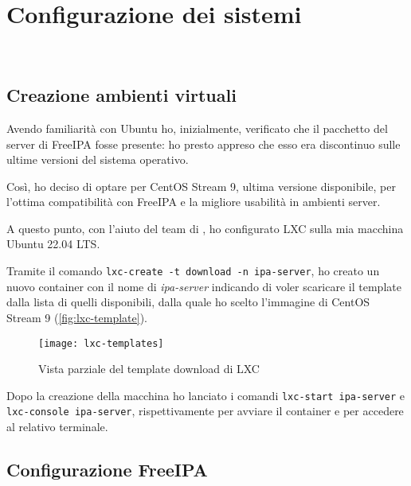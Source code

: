 
\chapter{Configurazione dei sistemi}
\label{cap:configurazione-sistemi}

\\

\section{Creazione ambienti virtuali}

Avendo familiarità con Ubuntu ho, inizialmente, verificato che il pacchetto del server di FreeIPA fosse presente: ho presto appreso che esso era discontinuo sulle ultime versioni del sistema operativo.

Così, ho deciso di optare per CentOS Stream 9, ultima versione disponibile, per l'ottima compatibilità con FreeIPA e la migliore usabilità in ambienti server.

A questo punto, con l'aiuto del team di \myAzienda, ho configurato LXC sulla mia macchina Ubuntu 22.04 LTS. 

Tramite il comando \texttt{lxc-create -t download -n ipa-server}, ho creato un nuovo container con il nome di \emph{ipa-server} indicando di voler scaricare il template dalla lista di quelli disponibili, dalla quale ho scelto l'immagine di CentOS Stream 9 (\autoref{fig:lxc-template}).

\begin{figure}[!h] 
    \centering 
    \texttt{[image: lxc-templates]} 
    \caption{Vista parziale del template download di LXC}
    \label{fig:lxc-template}
\end{figure}

Dopo la creazione della macchina ho lanciato i comandi \texttt{lxc-start ipa-server} e \texttt{lxc-console ipa-server}, rispettivamente per avviare il container e per accedere al relativo terminale.

\section{Configurazione FreeIPA}

